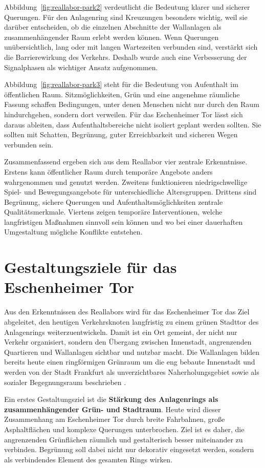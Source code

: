 \documentclass[a4paper,12pt]{article}
\begin{document}
Abbildung~\ref{fig:reallabor-park2} verdeutlicht die Bedeutung klarer und sicherer Querungen. Für den Anlagenring sind Kreuzungen besonders wichtig, weil sie darüber entscheiden, ob die einzelnen Abschnitte der Wallanlagen als zusammenhängender Raum erlebt werden können. Wenn Querungen unübersichtlich, lang oder mit langen Wartezeiten verbunden sind, verstärkt sich die Barrierewirkung des Verkehrs. Deshalb wurde auch eine Verbesserung der Signalphasen als wichtiger Ansatz aufgenommen.

Abbildung~\ref{fig:reallabor-park3} steht für die Bedeutung von Aufenthalt im öffentlichen Raum. Sitzmöglichkeiten, Grün und eine angenehme räumliche Fassung schaffen Bedingungen, unter denen Menschen nicht nur durch den Raum hindurchgehen, sondern dort verweilen. Für das Eschenheimer Tor lässt sich daraus ableiten, dass Aufenthaltsbereiche nicht isoliert geplant werden sollten. Sie sollten mit Schatten, Begrünung, guter Erreichbarkeit und sicheren Wegen verbunden sein.

Zusammenfassend ergeben sich aus dem Reallabor vier zentrale Erkenntnisse. Erstens kann öffentlicher Raum durch temporäre Angebote anders wahrgenommen und genutzt werden. Zweitens funktionieren niedrigschwellige Spiel- und Bewegungsangebote für unterschiedliche Altersgruppen. Drittens sind Begrünung, sichere Querungen und Aufenthaltsmöglichkeiten zentrale Qualitätsmerkmale. Viertens zeigen temporäre Interventionen, welche langfristigen Maßnahmen sinnvoll sein können und wo bei einer dauerhaften Umgestaltung mögliche Konflikte entstehen.

\FloatBarrier
\section{Gestaltungsziele für das Eschenheimer Tor}

Aus den Erkenntnissen des Reallabors wird für das Eschenheimer Tor das Ziel abgeleitet, den heutigen Verkehrsknoten langfristig zu einem grünen Stadttor des Anlagenrings weiterzuentwickeln. Damit ist ein Ort gemeint, der nicht nur Verkehr organisiert, sondern den Übergang zwischen Innenstadt, angrenzenden Quartieren und Wallanlagen sichtbar und nutzbar macht. Die Wallanlagen bilden bereits heute einen ringförmigen Grünraum um die eng bebaute Innenstadt und werden von der Stadt Frankfurt als unverzichtbares Naherholungsgebiet sowie als sozialer Begegnungsraum beschrieben \autocite{stadtfrankfurtwallanlagen2026}.

Ein erstes Gestaltungsziel ist die \textbf{Stärkung des Anlagenrings als zusammenhängender Grün- und Stadtraum}. Heute wird dieser Zusammenhang am Eschenheimer Tor durch breite Fahrbahnen, große Asphaltflächen und komplexe Querungen unterbrochen. Ziel ist es daher, die angrenzenden Grünflächen räumlich und gestalterisch besser miteinander zu verbinden. Begrünung soll dabei nicht nur dekorativ eingesetzt werden, sondern als verbindendes Element des gesamten Rings wirken.
\end{document}
